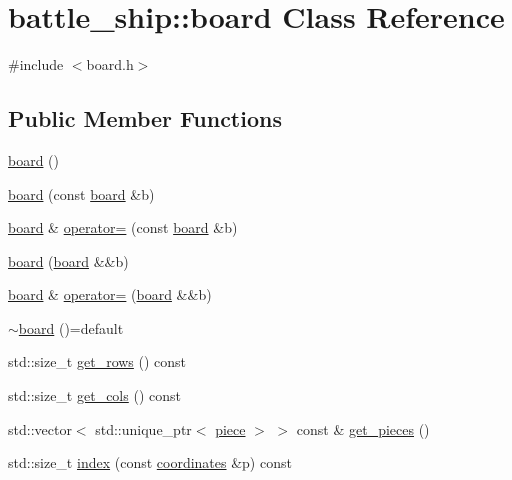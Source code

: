 \hypertarget{classbattle__ship_1_1board}{}\section{battle\+\_\+ship\+:\+:board Class Reference}
\label{classbattle__ship_1_1board}


{\ttfamily \#include $<$board.\+h$>$}

\subsection*{Public Member Functions}
\begin{DoxyCompactItemize}
\item 
\hyperlink{classbattle__ship_1_1board_a4d561505fe0c5d355e70bbd2bde1b00e}{board} ()
\item 
\hyperlink{classbattle__ship_1_1board_a72bdef4b84b4c2d8241b4307cae2cb9e}{board} (const \hyperlink{classbattle__ship_1_1board}{board} \&b)
\item 
\hyperlink{classbattle__ship_1_1board}{board} \& \hyperlink{classbattle__ship_1_1board_a4349c045147f686d09cdc47690f15e34}{operator=} (const \hyperlink{classbattle__ship_1_1board}{board} \&b)
\item 
\hyperlink{classbattle__ship_1_1board_aae7ac9e7bbd44c1b2d7a745721936ee2}{board} (\hyperlink{classbattle__ship_1_1board}{board} \&\&b)
\item 
\hyperlink{classbattle__ship_1_1board}{board} \& \hyperlink{classbattle__ship_1_1board_ae6dc011dea24157e59e2b3a6f34af586}{operator=} (\hyperlink{classbattle__ship_1_1board}{board} \&\&b)
\item 
\hyperlink{classbattle__ship_1_1board_a06d4ef9b5cb2dbb7aa4516464ff1ec52}{$\sim$board} ()=default
\item 
std\+::size\+\_\+t \hyperlink{classbattle__ship_1_1board_a74cf4399466cad172160f005da6d45fa}{get\+\_\+rows} () const
\item 
std\+::size\+\_\+t \hyperlink{classbattle__ship_1_1board_ad3d5995d4b8a0af0cfc802a1731f6a6d}{get\+\_\+cols} () const
\item 
std\+::vector$<$ std\+::unique\+\_\+ptr$<$ \hyperlink{classbattle__ship_1_1piece}{piece} $>$ $>$ const  \& \hyperlink{classbattle__ship_1_1board_ae621b104b6547d5648eca21c90d43609}{get\+\_\+pieces} ()
\item 
std\+::size\+\_\+t \hyperlink{classbattle__ship_1_1board_a26993290a06429eff02afa64d7314dd5}{index} (const \hyperlink{structbattle__ship_1_1coordinates}{coordinates} \&p) const

\end{DoxyCompactItemize}
